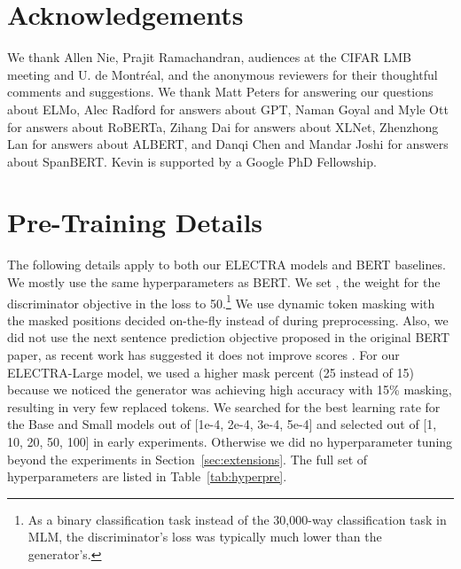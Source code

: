 \documentclass{article}
\begin{document}
\section*{Acknowledgements}
We thank Allen Nie, Prajit Ramachandran, audiences at the CIFAR LMB meeting and U. de Montr\'{e}al, and the anonymous reviewers for their thoughtful comments and suggestions. 
We thank Matt Peters for answering our questions about ELMo, Alec Radford for answers about GPT, Naman Goyal and Myle Ott for answers about RoBERTa, Zihang Dai for answers about XLNet, Zhenzhong Lan for answers about ALBERT, and Danqi Chen and Mandar Joshi for answers about SpanBERT. Kevin is supported by a Google PhD Fellowship.




\appendix

\section{Pre-Training Details}
\label{app:pre}
The following details apply to both our ELECTRA models and BERT baselines.
We mostly use the same hyperparameters as BERT.
We set , the weight for the discriminator objective in the loss to 50.\footnote{As a binary classification task instead of the 30,000-way classification task in MLM, the discriminator's loss was typically much lower than the generator's.}
We use dynamic token masking with the masked positions decided on-the-fly instead of during preprocessing.
Also, we did not use the next sentence prediction objective proposed in the original BERT paper, as recent work has suggested it does not improve scores \citep{yang2019xlnet,liu2019roberta}.
For our ELECTRA-Large model, we used a higher mask percent (25 instead of 15) because we noticed the generator was achieving high accuracy with 15\% masking, resulting in very few replaced tokens.
We searched for the best learning rate for the Base and Small models out of [1e-4, 2e-4, 3e-4, 5e-4] and selected  out of [1, 10, 20, 50, 100] in early experiments. Otherwise we did no hyperparameter tuning beyond the experiments in Section~\ref{sec:extensions}.
The full set of hyperparameters are listed in Table~\ref{tab:hyperpre}. 
\end{document}
